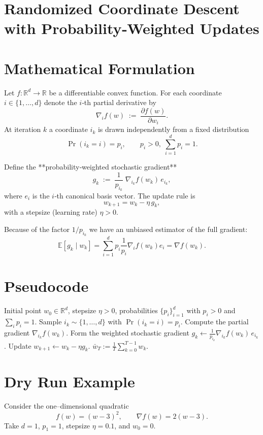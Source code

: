 \documentclass{article}
\newcommand{\E}{\mathbb{E}}
\newcommand{\R}{\mathbb{R}}
\begin{document}
\section*{Randomized Coordinate Descent with Probability‑Weighted Updates}

\section*{Mathematical Formulation}
Let $f:\R^{d}\to\R$ be a differentiable convex function.  
For each coordinate $i\in\{1,\dots,d\}$ denote the $i$‑th partial derivative by 
\[
\nabla_i f(w)\;:=\;\frac{\partial f(w)}{\partial w_i}.
\]
At iteration $k$ a coordinate $i_k$ is drawn independently from a fixed
distribution 
\[
\Pr(i_k=i)=p_i,\qquad p_i>0,\;\sum_{i=1}^{d}p_i=1 .
\]

Define the **probability‑weighted stochastic gradient**
\[
g_k \;:=\; \frac{1}{p_{i_k}}\;\nabla_{i_k}f(w_k)\,e_{i_k},
\]
where $e_i$ is the $i$‑th canonical basis vector.  
The update rule is
\begin{equation}\label{eq:update}
w_{k+1}=w_k-\eta\, g_k,
\end{equation}
with a stepsize (learning rate) $\eta>0$.

Because of the factor $1/p_{i_k}$ we have an unbiased estimator of the full
gradient:
\[
\E[g_k\mid w_k]=\sum_{i=1}^{d}p_i\frac{1}{p_i}\nabla_i f(w_k)e_i
               =\nabla f(w_k).
\tag{1}
\]

\section*{Pseudocode}
\begin{algorithm}[H]
\caption{Probability‑Weighted Randomized Coordinate Descent (PW‑RCD)}
\begin{algorithmic}[1]
\Require Initial point $w_0\in\R^{d}$, stepsize $\eta>0$, probabilities $\{p_i\}_{i=1}^{d}$ with $p_i>0$ and $\sum_i p_i=1$.
    \State Sample $i_k\sim\{1,\dots,d\}$ with $\Pr(i_k=i)=p_i$.
    \State Compute the partial gradient $\nabla_{i_k}f(w_k)$.
    \State Form the weighted stochastic gradient 
          $g_k\gets \frac{1}{p_{i_k}}\nabla_{i_k}f(w_k)\,e_{i_k}$.
    \State Update $w_{k+1}\gets w_k-\eta g_k$.
\EndFor
\State \Return $\displaystyle \bar w_T:=\frac{1}{T}\sum_{k=0}^{T-1} w_k$.
\end{algorithmic}
\end{algorithm}

\section*{Dry Run Example}
Consider the one–dimensional quadratic 
\[
f(w)=(w-3)^2,\qquad \nabla f(w)=2(w-3).
\]
Take $d=1$, $p_1=1$, stepsize $\eta=0.1$, and $w_0=0$.
\end{document}
